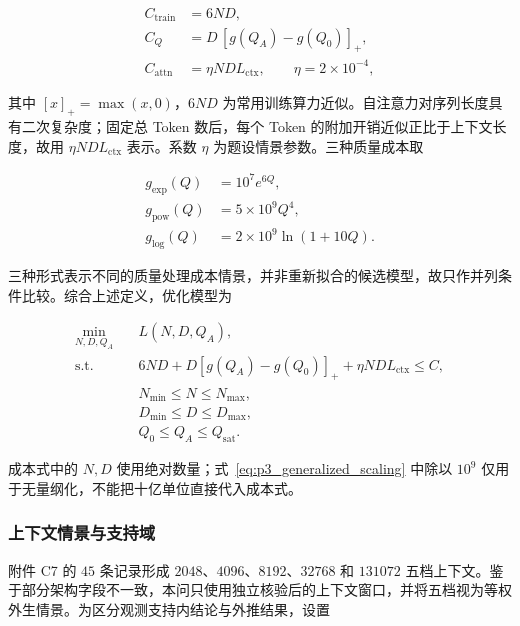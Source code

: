 \begin{equation}
\begin{aligned}
C_{\mathrm{train}}&=6ND,\\
C_Q&=D\,[g(Q_A)-g(Q_0)]_+,\\
C_{\mathrm{attn}}&=\eta NDL_{\mathrm{ctx}},
\qquad \eta=2\times10^{-4},
\end{aligned}
\label{eq:p3_three_costs}
\end{equation}

其中 $[x]_+=\max(x,0)$，$6ND$ 为常用训练算力近似\cite{kaplan2020scaling,hoffmann2022compute}。自注意力对序列长度具有二次复杂度\cite{vaswani2017attention}；固定总 Token 数后，每个 Token 的附加开销近似正比于上下文长度，故用 $\eta NDL_{\mathrm{ctx}}$ 表示。系数 $\eta$ 为题设情景参数。三种质量成本取

\begin{equation}
\begin{aligned}
g_{\exp}(Q)&=10^7e^{6Q},\\
g_{\mathrm{pow}}(Q)&=5\times10^9Q^4,\\
g_{\log}(Q)&=2\times10^9\ln(1+10Q).
\end{aligned}
\label{eq:p3_quality_costs}
\end{equation}

三种形式表示不同的质量处理成本情景，并非重新拟合的候选模型，故只作并列条件比较。综合上述定义，优化模型为

\begin{equation}
\begin{aligned}
\min_{N,D,Q_A}\quad
&L(N,D,Q_A),\\
\text{s.t.}\quad
&6ND+D[g(Q_A)-g(Q_0)]_+
+\eta NDL_{\mathrm{ctx}}\le C,\\
&N_{\min}\le N\le N_{\max},\\
&D_{\min}\le D\le D_{\max},\\
&Q_0\le Q_A\le Q_{\mathrm{sat}}.
\end{aligned}
\label{eq:p3_optimization}
\end{equation}

成本式中的 $N,D$ 使用绝对数量；式~\eqref{eq:p3_generalized_scaling} 中除以 $10^9$ 仅用于无量纲化，不能把十亿单位直接代入成本式。

\subsubsection{上下文情景与支持域}

附件 C7 的 $45$ 条记录形成 $2048$、$4096$、$8192$、$32768$ 和 $131072$ 五档上下文。鉴于部分架构字段不一致，本问只使用独立核验后的上下文窗口，并将五档视为等权外生情景。为区分观测支持内结论与外推结果，设置

